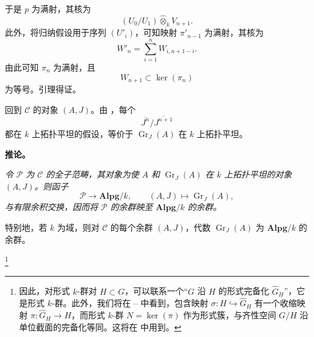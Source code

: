 于是 \(p\) 为满射，其核为
\[
  (U_0/U_1)\widehat\otimes_kV_{n+1}.
\]
此外，将归纳假设用于序列 \((U'_i)\)，可知映射 \(\pi'_{n-1}\) 为满射，其核为
\[
  W'_n
  =
  \sum_{i=1}^{n}W_{i,n+1-i}.
\]
由此可知 \(\pi_n\) 为满射，且
\[
  W_{n+1}\subset\ker(\pi_n)
\]
为等号。引理得证。

回到 \(\mathcal C\) 的对象 \((A,J)\)。由 ，每个
\[
  \overline{J^n}/\overline{J^{n+1}}
\]
都在 \(k\) 上拓扑平坦的假设，等价于 \(\operatorname{Gr}_J(A)\) 在 \(k\) 上拓扑平坦。

\medskip
\noindent\textbf{推论。}
\label{sga3:VIIB:5.1.2:corollary}
{\itshape 令 \(\mathcal P\) 为 \(\mathcal C\) 的全子范畴，其对象为使 \(A\) 和 \(\operatorname{Gr}_J(A)\) 在 \(k\) 上拓扑平坦的对象 \((A,J)\)。则函子
\[
  \mathcal P\longrightarrow\mathbf{Alpg}/k,
  \qquad
  (A,J)\longmapsto\operatorname{Gr}_J(A),
\]
与有限余积交换，因而将 \(\mathcal P\) 的余群映至 \(\mathbf{Alpg}/k\) 的余群。

特别地，若 \(k\) 为域，则对 \(\mathcal C\) 的每个余群 \((A,J)\)，代数 \(\operatorname{Gr}_J(A)\) 为 \(\mathbf{Alpg}/k\) 的余群。}
\footnote{\label{sga3:VIIB:nde:148}因此，对形式 \(k\)-群对 \(H\subset G\)，可以联系一个“\(G\) 沿 \(H\) 的形式完备化 \(\widehat G_H\)”，它是形式 \(k\)-群。此外，我们将在 -- 中看到，包含映射 \(\sigma:H\hookrightarrow\widehat G_H\) 有一个收缩映射 \(\pi:\widehat G_H\to H\)，而形式 \(k\)-群 \(N=\ker(\pi)\) 作为形式簇，与齐性空间 \(G/H\) 沿单位截面的完备化等同。这将在  中用到。}
